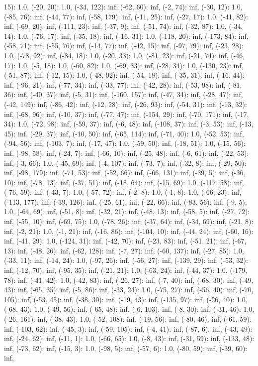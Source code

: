 \documentclass[parskip=half]{scrartcl}
\begin{document}
15): 1.0, (-20, 20): 1.0, (-34, 122): inf, (-62, 60): inf, (-2, 74): inf, (-30, 12): 1.0, (-85, 76): inf, (-44, 77): inf, (-58, 179): inf, (-11, 25): inf, (-27, 17): 1.0, (-41, 82): inf, (-69, 20): inf, (-111, 23): inf, (-37, 9): inf, (-51, 74): inf, (-32, 87): 1.0, (-34, 14): 1.0, (-76, 17): inf, (-35, 18): inf, (-16, 31): 1.0, (-118, 20): inf, (-173, 84): inf, (-58, 71): inf, (-55, 76): inf, (-14, 77): inf, (-42, 15): inf, (-97, 79): inf, (-23, 28): 1.0, (-78, 92): inf, (-84, 18): 1.0, (-20, 33): 1.0, (-81, 23): inf, (-21, 74): inf, (-46, 17): 1.0, (-5, 18): 1.0, (-60, 82): 1.0, (-69, 33): inf, (-28, 34): 1.0, (-130, 23): inf, (-51, 87): inf, (-12, 15): 1.0, (-48, 92): inf, (-54, 18): inf, (-35, 31): inf, (-16, 44): inf, (-96, 21): inf, (-77, 34): inf, (-33, 77): inf, (-42, 28): inf, (-53, 98): inf, (-81, 36): inf, (-40, 37): inf, (-5, 31): inf, (-160, 157): inf, (-47, 34): inf, (-28, 47): inf, (-42, 149): inf, (-86, 42): inf, (-12, 28): inf, (-26, 93): inf, (-54, 31): inf, (-13, 32): inf, (-68, 96): inf, (-10, 37): inf, (-77, 47): inf, (-154, 29): inf, (-70, 171): inf, (-17, 34): 1.0, (-72, 98): inf, (-59, 37): inf, (-6, 48): inf, (-108, 37): inf, (-3, 53): inf, (-13, 45): inf, (-29, 37): inf, (-10, 50): inf, (-65, 114): inf, (-71, 40): 1.0, (-52, 53): inf, (-94, 56): inf, (-103, 7): inf, (-17, 47): 1.0, (-59, 50): inf, (-18, 51): 1.0, (-15, 56): inf, (-98, 58): inf, (-24, 7): inf, (-66, 10): inf, (-25, 48): inf, (-6, 61): inf, (-22, 53): inf, (-3, 66): 1.0, (-45, 69): inf, (-4, 107): inf, (-73, 7): inf, (-32, 8): inf, (-29, 50): inf, (-98, 179): inf, (-71, 53): inf, (-52, 66): inf, (-66, 131): inf, (-39, 5): inf, (-36, 10): inf, (-78, 13): inf, (-37, 51): inf, (-18, 64): inf, (-15, 69): 1.0, (-117, 58): inf, (-76, 59): inf, (-43, 7): 1.0, (-57, 72): inf, (-2, 8): 1.0, (-1, 8): 1.0, (-66, 23): inf, (-113, 177): inf, (-39, 126): inf, (-25, 61): inf, (-22, 66): inf, (-83, 56): inf, (-9, 5): 1.0, (-64, 69): inf, (-51, 8): inf, (-32, 21): inf, (-48, 13): inf, (-58, 5): inf, (-27, 72): inf, (-55, 10): inf, (-69, 75): 1.0, (-78, 26): inf, (-37, 64): inf, (-34, 69): inf, (-21, 8): inf, (-2, 21): 1.0, (-1, 21): inf, (-16, 86): inf, (-104, 10): inf, (-44, 24): inf, (-60, 16): inf, (-41, 29): 1.0, (-124, 31): inf, (-42, 70): inf, (-23, 83): inf, (-51, 21): inf, (-67, 13): inf, (-48, 26): inf, (-62, 128): inf, (-7, 27): inf, (-60, 137): inf, (-27, 85): 1.0, (-33, 11): inf, (-14, 24): 1.0, (-97, 26): inf, (-56, 27): inf, (-139, 29): inf, (-53, 32): inf, (-12, 70): inf, (-95, 35): inf, (-21, 21): 1.0, (-63, 24): inf, (-44, 37): 1.0, (-179, 78): inf, (-41, 42): 1.0, (-42, 83): inf, (-26, 27): inf, (-7, 40): inf, (-68, 30): inf, (-49, 43): inf, (-65, 35): inf, (-5, 86): inf, (-33, 24): 1.0, (-75, 27): inf, (-56, 40): inf, (-70, 105): inf, (-53, 45): inf, (-38, 30): inf, (-19, 43): inf, (-135, 97): inf, (-26, 40): 1.0, (-68, 43): 1.0, (-49, 56): inf, (-65, 48): inf, (-6, 103): inf, (-8, 30): inf, (-31, 46): 1.0, (-26, 161): inf, (-38, 43): 1.0, (-52, 108): inf, (-19, 56): inf, (-80, 46): inf, (-61, 59): inf, (-103, 62): inf, (-45, 3): inf, (-59, 105): inf, (-4, 41): inf, (-87, 6): inf, (-43, 49): inf, (-24, 62): inf, (-11, 1): 1.0, (-66, 65): 1.0, (-8, 43): inf, (-31, 59): inf, (-133, 48): inf, (-73, 62): inf, (-15, 3): 1.0, (-98, 5): inf, (-57, 6): 1.0, (-80, 59): inf, (-39, 60): inf, 
\end{document}

